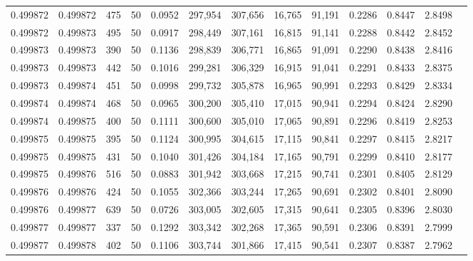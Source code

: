 \begin{tabular}{rrrrrrrrrrrrr}
0.499872 & 0.499872 &   475 &  50 &                                     0.0952 & 297,954 & 307,656 &  16,765 &  91,191 & 0.2286 & 0.8447 & 2.8498 \\
0.499872 & 0.499873 &   495 &  50 &                                     0.0917 & 298,449 & 307,161 &  16,815 &  91,141 & 0.2288 & 0.8442 & 2.8452 \\
0.499873 & 0.499873 &   390 &  50 &                                     0.1136 & 298,839 & 306,771 &  16,865 &  91,091 & 0.2290 & 0.8438 & 2.8416 \\
0.499873 & 0.499873 &   442 &  50 &                                     0.1016 & 299,281 & 306,329 &  16,915 &  91,041 & 0.2291 & 0.8433 & 2.8375 \\
0.499873 & 0.499874 &   451 &  50 &                                     0.0998 & 299,732 & 305,878 &  16,965 &  90,991 & 0.2293 & 0.8429 & 2.8334 \\
0.499874 & 0.499874 &   468 &  50 &                                     0.0965 & 300,200 & 305,410 &  17,015 &  90,941 & 0.2294 & 0.8424 & 2.8290 \\
0.499874 & 0.499875 &   400 &  50 &                                     0.1111 & 300,600 & 305,010 &  17,065 &  90,891 & 0.2296 & 0.8419 & 2.8253 \\
0.499875 & 0.499875 &   395 &  50 &                                     0.1124 & 300,995 & 304,615 &  17,115 &  90,841 & 0.2297 & 0.8415 & 2.8217 \\
0.499875 & 0.499875 &   431 &  50 &                                     0.1040 & 301,426 & 304,184 &  17,165 &  90,791 & 0.2299 & 0.8410 & 2.8177 \\
0.499875 & 0.499876 &   516 &  50 &                                     0.0883 & 301,942 & 303,668 &  17,215 &  90,741 & 0.2301 & 0.8405 & 2.8129 \\
0.499876 & 0.499876 &   424 &  50 &                                     0.1055 & 302,366 & 303,244 &  17,265 &  90,691 & 0.2302 & 0.8401 & 2.8090 \\
0.499876 & 0.499877 &   639 &  50 &                                     0.0726 & 303,005 & 302,605 &  17,315 &  90,641 & 0.2305 & 0.8396 & 2.8030 \\
0.499877 & 0.499877 &   337 &  50 &                                     0.1292 & 303,342 & 302,268 &  17,365 &  90,591 & 0.2306 & 0.8391 & 2.7999 \\
0.499877 & 0.499878 &   402 &  50 &                                     0.1106 & 303,744 & 301,866 &  17,415 &  90,541 & 0.2307 & 0.8387 & 2.7962 \\

\end{tabular}
